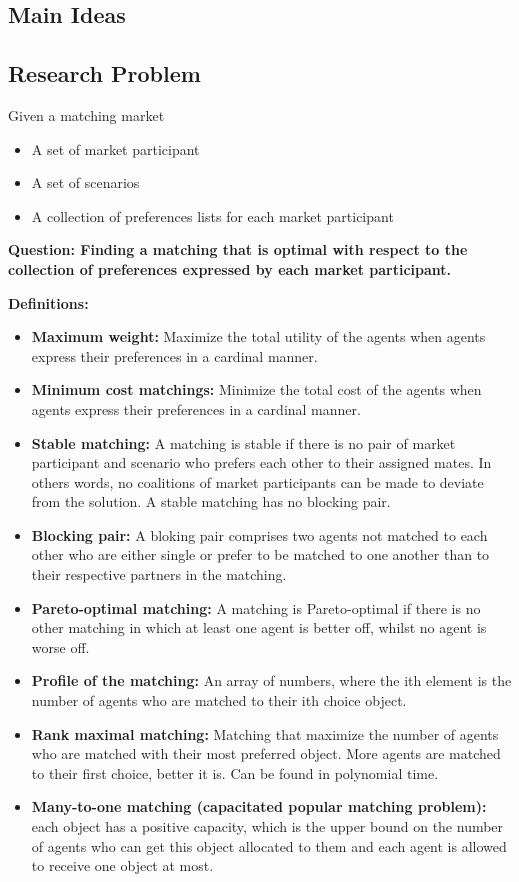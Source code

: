 \documentclass[12pt,a4paper]{article}
\begin{document}
\subsection*{Main Ideas}
\begin{tcolorbox}[colback=blue!5!white, colframe=blue!50!black]

\end{tcolorbox}

\subsection*{Research Problem}
Given a matching market
\begin{itemize}
    \item A set of market participant
    \item A set of scenarios
    \item A collection of preferences lists for each market participant 
\end{itemize}
\textbf{Question: Finding a matching that is optimal with respect to the collection of preferences expressed by each market participant.}

\textbf{Definitions:}
\begin{itemize}
    \item \textbf{Maximum weight:} Maximize the total utility of the agents when agents express their preferences in a cardinal manner.
    \item \textbf{Minimum cost matchings:} Minimize the total cost of the agents when agents express their preferences in a cardinal manner.
    \item \textbf{Stable matching:} A matching is stable if there is no pair of market participant and scenario who prefers each other to their assigned mates. In others words, no coalitions of market participants can be made to deviate from the solution. A stable matching has no blocking pair.
    \item \textbf{Blocking pair:} A bloking pair comprises two agents not matched to each other who are either single or prefer to be matched to one another than to their respective partners in the matching.
    \item \textbf{Pareto-optimal matching:} A matching is Pareto-optimal if there is no other matching in which at least one agent is better off, whilst no agent is worse off. 
    \item \textbf{Profile of the matching:} An array of numbers, where the ith element is the number of agents who are matched to their ith choice object.
    \item \textbf{Rank maximal matching:} Matching that maximize the number of agents who are matched with their most preferred object. More agents are matched to their first choice, better it is. Can be found in polynomial time.
    \item \textbf{Many-to-one matching (capacitated popular matching problem):} each object has a positive capacity, which is the upper bound on the number of agents who can get this object allocated to them and each agent is allowed to receive one object at most.

\end{itemize}
\end{document}
